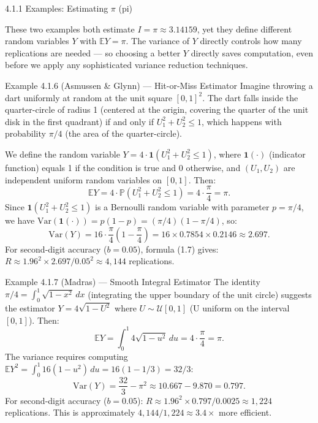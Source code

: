 \documentclass[aspectratio=169,10pt]{beamer}
\begin{document}
\begin{frame}[allowframebreaks]{4.1.1 Examples: Estimating $\pi$ (pi)}

These two examples both estimate $I = \pi \approx 3.14159$, yet they
define different random variables $Y$ with $\mathbb{E}Y = \pi$.  The
variance of $Y$ directly controls how many replications are needed ---
so choosing a better $Y$ directly saves computation, even before we
apply any sophisticated variance reduction techniques.

\begin{block}{Example 4.1.6 (Asmussen \& Glynn) --- Hit-or-Miss Estimator}
  Imagine throwing a dart uniformly at random at the unit square
  $[0,1]^2$.  The dart falls inside the quarter-circle of radius 1
  (centered at the origin, covering the quarter of the unit disk in the
  first quadrant) if and only if $U_1^2 + U_2^2 \leq 1$, which happens
  with probability $\pi/4$ (the area of the quarter-circle).

  We define the random variable $Y = 4 \cdot \mathbf{1}(U_1^2 + U_2^2 \leq 1)$,
  where $\mathbf{1}(\cdot)$ (indicator function) equals 1 if the
  condition is true and 0 otherwise, and $(U_1, U_2)$ are independent
  uniform random variables on $[0,1]$.  Then:
  \[
    \mathbb{E}Y = 4 \cdot \mathbb{P}(U_1^2 + U_2^2 \leq 1) = 4 \cdot \frac{\pi}{4} = \pi.
  \]
  Since $\mathbf{1}(U_1^2 + U_2^2 \leq 1)$ is a Bernoulli random
  variable with parameter $p = \pi/4$, we have
  $\mathrm{Var}(\mathbf{1}(\cdot)) = p(1-p) = (\pi/4)(1 - \pi/4)$, so:
  \[
    \mathrm{Var}(Y) = 16 \cdot \frac{\pi}{4}\!\left(1 - \frac{\pi}{4}\right)
      = 16 \times 0.7854 \times 0.2146 \approx 2.697.
  \]
  For second-digit accuracy ($b = 0.05$), formula (1.7) gives:
  $R \approx 1.96^2 \times 2.697 / 0.05^2 \approx 4{,}144$ replications.
\end{block}

\begin{block}{Example 4.1.7 (Madras) --- Smooth Integral Estimator}
  The identity $\pi/4 = \int_0^1 \sqrt{1-x^2}\,dx$ (integrating the
  upper boundary of the unit circle) suggests the estimator
  $Y = 4\sqrt{1 - U^2}$ where $U \sim \mathcal{U}[0,1]$ (U uniform
  on the interval $[0,1]$).  Then:
  \[
    \mathbb{E}Y = \int_0^1 4\sqrt{1-u^2}\,du = 4 \cdot \frac{\pi}{4} = \pi.
  \]
  The variance requires computing $\mathbb{E}Y^2 = \int_0^1 16(1-u^2)\,du = 16(1 - 1/3) = 32/3$:
  \[
    \mathrm{Var}(Y) = \frac{32}{3} - \pi^2 \approx 10.667 - 9.870 = 0.797.
  \]
  For second-digit accuracy ($b = 0.05$):
  $R \approx 1.96^2 \times 0.797 / 0.0025 \approx 1{,}224$ replications.
  This is approximately $4{,}144 / 1{,}224 \approx \mathbf{3.4\times}$ more efficient.
\end{block}


\end{frame}
\end{document}

